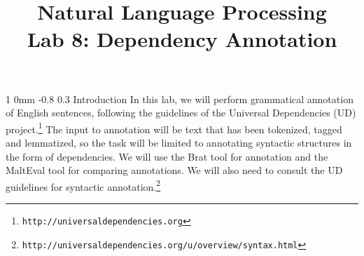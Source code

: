 \documentclass[10.9pt]{article}
\title{{\LARGE Natural Language Processing}\\[1.5mm]{\large Lab 8: Dependency Annotation}}
\author{}
\date{} %
\makeatletter
\newcommand{\newsec}[2]{\section{#1}\label{sec:#2}\noindent}
\renewcommand{\section}{\@startsection
{section}%
{1}%
{0mm}%
{-0.8\baselineskip}%
{0.3\baselineskip}%
{\bfseries\large}}%
\makeatother
\begin{document}
 

\maketitle
\vspace{-2mm}
\newsec{Introduction}{intro}%
In this lab, we will perform grammatical annotation of English sentences, following the guidelines of the Universal Dependencies (UD) project.\footnote{{\tt http://universaldependencies.org}} The input to annotation will be text that has been tokenized, tagged and lemmatized, so the task will be limited to annotating syntactic structures
in the form of dependencies. 
We will use the Brat tool for annotation and the MaltEval tool for comparing annotations. We will also need to consult the UD guidelines for syntactic annotation.\footnote{{\tt http://universaldependencies.org/u/overview/syntax.html}}
\end{document}

